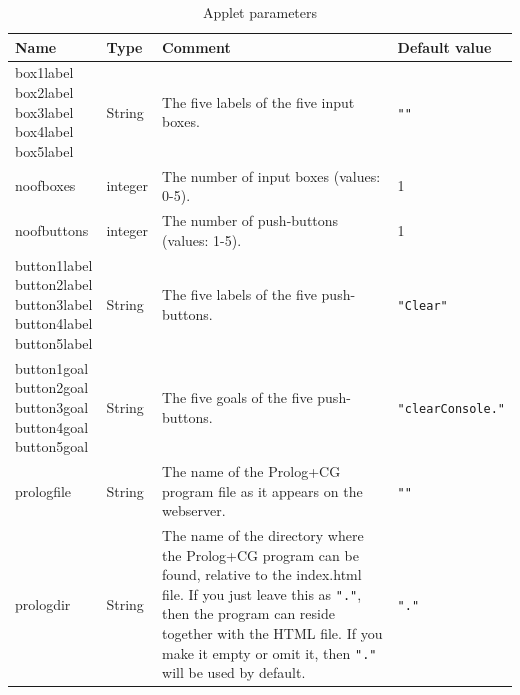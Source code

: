 \documentclass{book}
\begin{document}
\begin{table}
\begin{tabular}{|l|l|l|l|}
\hline
  {\bf Name} &
  {\bf Type} &
  {\bf Comment} &
  {\bf Default value} \\ %
\hline

  \parbox{2.0cm}{box1label\\
box2label\\
box3label\\
box4label\\
box5label} &
  String &
  \parbox{4.6cm}{The five labels of the five input boxes.} &
  \verb|""| \\ %
\hline

  noofboxes &
  integer &
  \parbox{4.6cm}{The number of input boxes (values: 0-5).} &
  1 \\ %
\hline

  noofbuttons &
  integer &
  \parbox{4.6cm}{The number of push-buttons (values: 1-5).} &
  1 \\ %
\hline

  \parbox{2.0cm}{button1label\\
button2label\\
button3label\\
button4label\\
button5label} &
  String &
  \parbox{4.6cm}{The five labels of the five push-buttons.} &
  \texttt{"Clear"} \\ %
\hline

  \parbox{2.0cm}{button1goal\\
button2goal\\
button3goal\\
button4goal\\
button5goal} &
  String & 
  \parbox{4.6cm}{The five goals of the five push-buttons.} &
  \texttt{"clearConsole."} \\ %
\hline

  prologfile &
  String & 
  \parbox{4.6cm}{
  The name of the Prolog+CG program file as it appears on the webserver.} &
  \verb|""| \\ %
\hline

  prologdir & 
  String &
  \parbox{4.6cm}{The name of the directory where the Prolog+CG program
  can be found, relative to the index.html file.  If you just leave
  this as \texttt{"."}, then the program can reside together with the
  HTML file.  If you make it empty or omit it, then \texttt{"."}
  will be used by default.} &
  \texttt{"."} \\ %
\hline

\end{tabular}
\caption{\label{AppletParameters}Applet parameters}
\end{table}
\end{document}
